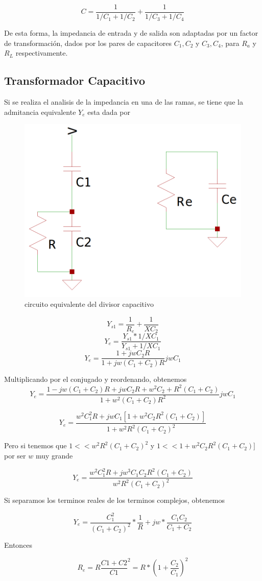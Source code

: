 $$
C = \frac{1}{1/C_1+1/C_2} + \frac{1}{1/C_3+1/C_4}
$$

De esta forma, la impedancia de entrada y de salida son adaptadas por un factor de transformación, dados por los pares de capacitores $C_1,C_2$ y $C_3,C_4$, para $R_a$ y $R_L$ respectivamente. 

\subsection{Transformador Capacitivo}

Si se realiza el analisis de la impedancia en una de las ramas, se tiene que la admitancia equivalente $Y_e$ esta dada por

\begin{figure}
    \centering
    \includegraphics[width=0.5\linewidth]{fig/divcap.png}
    \caption{circuito equivalente del divisor capacitivo}
    \label{fig:enter-label}
\end{figure}

$$
Y_{s1} = \frac{1}{R_e}+\frac{1}{XC_2} 
$$
$$
Y_e = \frac{Y_{s1}*1/XC_1}{Y_{s1}+1/XC_1}
$$
$$
Y_e = \frac{1+jwC_2R}{1+jw(C_1+C_2)R}jwC_1
$$

Multiplicando por el conjugado y reordenando, obtenemos
$$
Y_e = \frac{1-jw(C_1+C_2)R+jwC_2R+w^2C_2+R^2(C_1+C_2)}{1+w^2(C_1+C_2)R^2}jwC_1
$$

$$
Y_e = \frac{w^2C_1^2R+jwC_1[1+w^2C_2R^2(C_1+C_2)]}{1+w^2R^2(C_1+C_2)^2}
$$

Pero si tenemos que $1<<w^2R^2(C_1+C_2)^2$ y $1<<1+w^2C_2R^2(C_1+C_2)]$ por ser $w$ muy grande

$$
Y_e = \frac{w^2C_1^2R+jw^3C_1C_2R^2(C_1+C_2)}{w^2R^2(C_1+C_2)^2}
$$

Si separamos los terminos reales de los terminos complejos, obtenemos

$$
Y_e = \frac{C_1^2}{(C_1+C_2)^2}*\frac{1}{R}+jw*\frac{C_1C_2}{C_1+C_2}
$$

Entonces

$$R_e = R\frac{C1+C2}{C1}^2=R*(1+\frac{C_2}{C_1})^2$$

